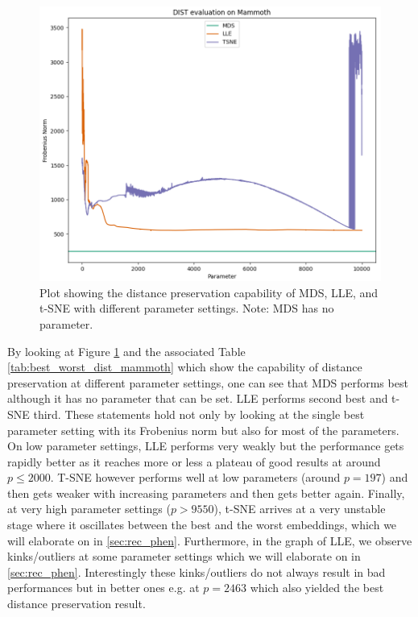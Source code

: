 \begin{figure}[!]
	\centering
	\includegraphics[width=1\columnwidth]{images/DIST_MAMM_all.png}
	\caption[3D-Mammoth Distance Preservation]{Plot showing the distance preservation capability of MDS, LLE, and t-SNE with different parameter settings. Note: MDS has no parameter.}
    \label{fig:best_worst_dist_mammoth}
\end{figure}

By looking at Figure \ref{fig:best_worst_dist_mammoth} and the associated Table \ref{tab:best_worst_dist_mammoth} which show the capability of distance preservation at different parameter settings, one can see that MDS performs best although it has no parameter that can be set. LLE performs second best and t-SNE third. These statements hold not only by looking at the single best parameter setting with its Frobenius norm but also for most of the parameters. On low parameter settings, LLE performs very weakly but the performance gets rapidly better as it reaches more or less a plateau of good results at around $p\leq 2000$. T-SNE however performs well at low parameters (around $p=197$) and then gets weaker with increasing parameters and then gets better again. Finally, at very high parameter settings ($p>9550$), t-SNE arrives at a very unstable stage where it oscillates between the best and the worst embeddings, which we will elaborate on in \ref{sec:rec_phen}. Furthermore, in the graph of LLE, we observe kinks/outliers at some parameter settings which we will elaborate on in \ref{sec:rec_phen}. Interestingly these kinks/outliers do not always result in bad performances but in better ones e.g. at $p=2463$ which also yielded the best distance preservation result.

